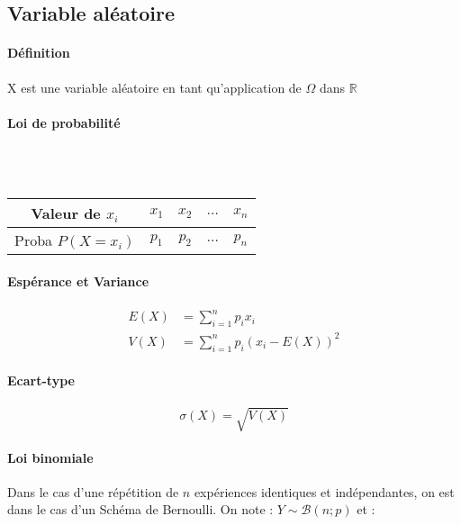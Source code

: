 \documentclass{report}
\begin{document}
    \subsection{Variable aléatoire}

    \paragraph{Définition}
    X est une variable aléatoire en tant qu'application de $\Omega$ dans $\mathbb{R}$

    \paragraph{Loi de probabilité} ~\\ ~

    \begin{table}[htp!]
      \begin{center}
        \begin{tabular}{|c|c|c|c|c|}
          \hline
          Valeur de $x_i$ & $x_1$ & $x_2$ & $\ldots$  & $x_n$ \\ \hline
          Proba $P(X=x_i)$ & $p_1$ & $p_2$ & $\ldots$ & $p_n$ \\ \hline
        \end{tabular}
      \end{center}
    \end{table}

    \paragraph{Espérance et Variance}
    \begin{align*}
      E(X) &= \sum_{i=1}^{n} p_i x_i \\
      V(X) &= \sum_{i=1}^{n} p_i (x_i - E(X))^2
    \end{align*}

    \paragraph{Ecart-type}

    \[\sigma(X) = \sqrt{V(X)}\]

    \paragraph{Loi binomiale}
    Dans le cas d'une répétition de $n$ expériences identiques et indépendantes, on est dans le cas d'un Schéma de Bernoulli. On note : \(\boxed{Y\sim \mathcal{B}(n;p)}\)
    et : 
\end{document}
